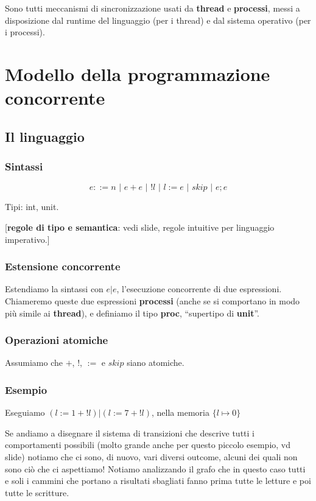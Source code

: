 \documentclass[a4paper,10pt]{article}
\begin{document}
Sono tutti meccanismi di sincronizzazione usati da \textbf{thread} e \textbf{processi}, messi a disposizione dal runtime del linguaggio (per i thread) e dal sistema operativo (per i processi).


\newpage

\section{Modello della programmazione concorrente}

\subsection{Il linguaggio}

\subsubsection{Sintassi}
\[e ::= n \,\,|\,\, e+e \,\,|\,\, !l \,\,|\,\, l := e \,\,|\,\, skip \,\,|\,\, e;e\]

Tipi: int, unit.

[\textbf{regole di tipo e semantica}: vedi slide, regole intuitive per linguaggio imperativo.]

\subsubsection{Estensione concorrente}
Estendiamo la sintassi con $e | e$, l'esecuzione concorrente di due espressioni. Chiameremo queste due espressioni \textbf{processi} (anche se si comportano in modo più simile ai \textbf{thread}), e definiamo il tipo \textbf{proc}, ``supertipo di \textbf{unit}''. 

\subsubsection{Operazioni atomiche}
Assumiamo che $+$, $!$, $:=$ e $skip$ siano atomiche.

\subsubsection{Esempio}

Eseguiamo $(l := 1 + !l) | (l := 7 + !l)$, nella memoria $\{ l \mapsto 0 \}$\smallskip

Se andiamo a disegnare il sistema di transizioni che descrive tutti i comportamenti possibili (molto grande anche per questo piccolo esempio, vd slide) notiamo che ci sono, di nuovo, vari diversi outcome, alcuni dei quali non sono ciò che ci aspettiamo! Notiamo analizzando il grafo che in questo caso tutti e soli i cammini che portano a risultati sbagliati fanno prima tutte le letture e poi tutte le scritture.\smallskip
\end{document}

